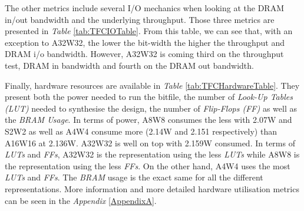 
The other metrics include several I/O mechanics when looking at the DRAM in/out bandwidth and the underlying throughput. Those three metrics are presented in \emph{Table} \ref{tab:TFCIOTable}. From this table, we can see that, with an exception to A32W32, the lower the bit-width the higher the throughput and DRAM i/o bandwidth. However, A32W32 is coming third on the throughput test, DRAM in bandwidth and fourth on the DRAM out bandwidth.

\begin{table}[!htb]
  \centering
\caption[TFC Hardware Utilisation Table]{TFC Hardware Utilisation}
\label{tab:TFCHardwareTable}
\end{table}

Finally, hardware resources are available in \emph{Table} \ref{tab:TFCHardwareTable}. They present both the power needed to run the bitfile, the number of \emph{Look-Up Tables (LUT)} needed to synthesise the design, the number of \emph{Flip-Flops (FF)} as well as the \emph{BRAM Usage}. In terms of power, A8W8 consumes the less with 2.07W and S2W2 as well as A4W4 consume more (2.14W and 2.151 respectively) than A16W16 at 2.136W. A32W32 is well on top with 2.159W consumed. In terms of \emph{LUTs} and \emph{FFs}, A32W32 is the representation using the less \emph{LUTs} while A8W8 is the representation using the less \emph{FFs}. On the other hand, A4W4 uses the most \emph{LUTs} and \emph{FFs}. The \emph{BRAM} usage is the exact same for all the different representations. More information and more detailed hardware utilisation metrics can be seen in the \emph{Appendix} \ref{AppendixA}.

